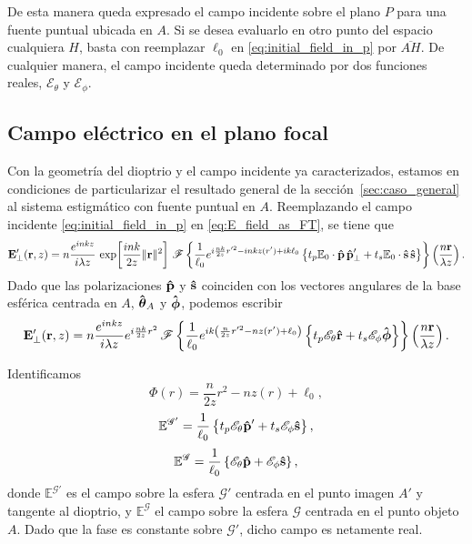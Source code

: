 De esta manera queda expresado el campo incidente sobre el plano $P$ para una fuente puntual ubicada en $A$. Si se desea evaluarlo en otro punto del espacio cualquiera $H$, basta con reemplazar $\ell_0$ en \eqref{eq:initial_field_in_p} por $\overline{AH}$. De cualquier manera, el campo incidente queda determinado por dos funciones reales, $\mathscr E_\theta$ y $\mathscr E_\phi$.

\subsection{Campo eléctrico en el plano focal}

Con la geometría del dioptrio y el campo incidente ya caracterizados, estamos en condiciones de particularizar el resultado general de la sección~\ref{sec:caso_general} al sistema estigmático con fuente puntual en $A$. Reemplazando el campo incidente \eqref{eq:initial_field_in_p} en \eqref{eq:E_field_as_FT}, se tiene que
\begin{equation}
\vb{E}'_\perp(\vb r,z)
=
n\frac{e^{inkz}}{i\lambda z}\,
\exp\!\left[
\frac{ink}{2z}\|\vb r\|^2
\right]
\,
\mathscr F
\left\{
\frac{1}{\ell_0}
e^{i\frac{nk}{2 z}r'^2 - inkz(r') + ik\ell_0}
\left\{
t_p \mathbb E_0 \cdot \bm{\hat{\mathbf{p}}} \, \bm{\hat{\mathbf{p}}}'_\perp
+
t_s \mathbb E_0 \cdot \bm{\hat{\mathbf{s}}} \, \bm{\hat{\mathbf{s}}}
\right\}
\right\}
\left(
\frac{n\vb r}{\lambda z}
\right).
\end{equation}
Dado que las polarizaciones $\bm{\hat{\mathbf{p}}}$ y $\bm{\hat{\mathbf{s}}}$ coinciden con los vectores angulares de la base esférica centrada en $A$, $\bm{\hat{\mathbf{\theta}}}_A$ y $\bm{\hat{\mathbf{\phi}}}$, podemos escribir
\begin{equation}
\vb{E}'_\perp(\vb r,z)
=
n\frac{e^{inkz}}{i\lambda z}e^{i\frac{nk}{2z}r^2}
\,
\mathscr F
\left\{
\frac{1}{\ell_0}
e^{ik\left( \frac{n}{2 z}r'^2 - nz(r') + \ell_0 \right) }
\left\{
t_p \mathscr E_{\theta} \bm{\hat{\mathbf{r}}}
+
t_s \mathscr E_{\phi} \bm{\hat{\mathbf{\phi}}}
\right\}
\right\}
\left(
\frac{n\vb r}{\lambda z}
\right).
\label{eq:E_perp_for_ovoid_in_prog}
\end{equation}

Identificamos
\begin{equation}
  \Phi(r)
  =
  \frac{n}{2z}r^2
  -
  nz(r)
  +
  \ell_0,
\end{equation}
\begin{equation}
  \mathbb E^{\mathscr G'}
  =
  \frac{1}{\ell_0}
  \left\{
  t_p \mathscr E_\theta \bm{\hat{\mathbf{p}}}'
  +
  t_s \mathscr E_\phi \bm{\hat{\mathbf{s}}}
  \right\},
  \label{eq:E_G_prime_def}
\end{equation}
\begin{equation}
  \mathbb E^{\mathscr G}
  =
  \frac{1}{\ell_0}
  \left\{
  \mathscr E_\theta \bm{\hat{\mathbf{p}}}
  +
  \mathscr E_\phi \bm{\hat{\mathbf{s}}}
  \right\},
  \label{eq:E_G_def}
\end{equation}
donde $\mathbb E^{\mathscr G'}$ es el campo sobre la esfera $\mathscr G'$ centrada en el punto imagen $A'$ y tangente al dioptrio, y $\mathbb E^{\mathscr G}$ el campo sobre la esfera $\mathscr G$ centrada en el punto objeto $A$. Dado que la fase es constante sobre $\mathscr G'$, dicho campo es netamente real.

